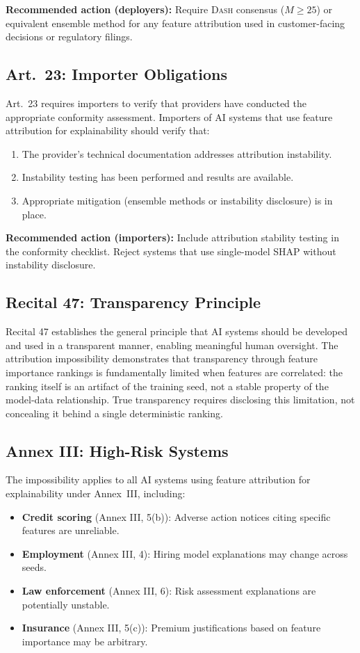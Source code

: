 \documentclass{article}
\newcommand{\DASH}{\textsc{Dash}}
\begin{document}
\textbf{Recommended action (deployers):} Require \DASH{} consensus ($M \geq 25$) or equivalent ensemble method for any feature attribution used in customer-facing decisions or regulatory filings.

\subsection*{Art.~23: Importer Obligations}

Art.~23 requires importers to verify that providers have conducted the appropriate conformity assessment. Importers of AI systems that use feature attribution for explainability should verify that:
\begin{enumerate}
    \item The provider's technical documentation addresses attribution instability.
    \item Instability testing has been performed and results are available.
    \item Appropriate mitigation (ensemble methods or instability disclosure) is in place.
\end{enumerate}

\textbf{Recommended action (importers):} Include attribution stability testing in the conformity checklist. Reject systems that use single-model SHAP without instability disclosure.

\subsection*{Recital 47: Transparency Principle}

Recital 47 establishes the general principle that AI systems should be developed and used in a transparent manner, enabling meaningful human oversight. The attribution impossibility demonstrates that transparency through feature importance rankings is fundamentally limited when features are correlated: the ranking itself is an artifact of the training seed, not a stable property of the model-data relationship. True transparency requires disclosing this limitation, not concealing it behind a single deterministic ranking.

\subsection*{Annex III: High-Risk Systems}

The impossibility applies to all AI systems using feature attribution for explainability under Annex~III, including:
\begin{itemize}
    \item \textbf{Credit scoring} (Annex III, 5(b)): Adverse action notices citing specific features are unreliable.
    \item \textbf{Employment} (Annex III, 4): Hiring model explanations may change across seeds.
    \item \textbf{Law enforcement} (Annex III, 6): Risk assessment explanations are potentially unstable.
    \item \textbf{Insurance} (Annex III, 5(c)): Premium justifications based on feature importance may be arbitrary.
\end{itemize}
\end{document}
